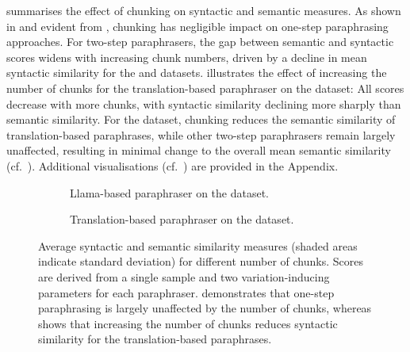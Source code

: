  summarises the effect of chunking on syntactic and semantic measures. 
As shown in  and evident from , chunking has negligible impact on one-step paraphrasing approaches. 
For two-step paraphrasers, the gap between semantic and syntactic scores widens with increasing chunk numbers, driven by a decline in mean syntactic similarity for the \dataBlog{} and \dataStudent{} datasets.
 illustrates the effect of increasing the number of chunks for the translation-based paraphraser on the \dataBlog{} dataset: 
All scores decrease with more chunks, with syntactic similarity declining more sharply than semantic similarity.
For the \dataGutenberg{} dataset, chunking reduces the semantic similarity of translation-based paraphrases, while other two-step paraphrasers remain largely unaffected, resulting in minimal change to the overall mean semantic similarity (cf.\ ). 
Additional visualisations (cf.\ ) are provided in the Appendix.

\begin{figure}[H]
  \centering
  \begin{subfigure}[b]{\textwidth}
    \centering
    
    \caption[Llama-based paraphraser on \dataStudent{}]{Llama-based paraphraser on the \dataStudent{} dataset.
    }
    \label{fig:abl_chunks_student_essays_llama}
  \end{subfigure}

  \hfill

  \begin{subfigure}[b]{\textwidth}
    \centering
    
    \caption[Translation-based paraphraser on \dataBlog{}]{
    Translation-based paraphraser on the \dataBlog{} dataset.    
    }
    \label{fig:abl_chunks_blog_translation}
  \end{subfigure}
  \caption[Effect of chunking on syntactic and semantic measures]{Average syntactic and semantic similarity measures (shaded areas indicate standard deviation) for different number of chunks.
  Scores are derived from a single sample and two variation-inducing parameters for each paraphraser.
   demonstrates that one-step paraphrasing is largely unaffected by the number of chunks, whereas  shows that increasing the number of chunks reduces syntactic similarity for the translation-based paraphrases.
  }
  \label{fig:abl_chunks}
\end{figure}


